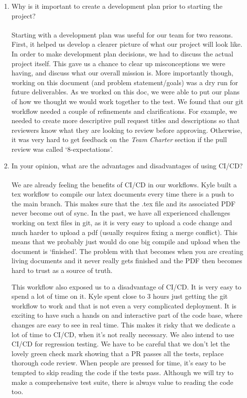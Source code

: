 \documentclass{article}
\begin{document}
\begin{itemize}
\begin{enumerate}
    \item Why is it important to create a development plan prior to starting the
    project?\\\\
    Starting with a development plan was useful for our team for two reasons. First, it helped us develop a clearer picture of what our project will look
    like. In order to make development plan decisions, we had to discuss the actual project itself. This gave us a chance to clear up misconceptions
    we were having, and discuss what our overall mission is. More importantly though, working on this document (and problem statement/goals)
    was a dry run for future deliverables. As we worked on this doc, we were able to put our plans of how we thought we would work together to the test. We found 
    that our git workflow needed a couple of refinements and clarifications. For example, we needed to create more descriptive pull request titles and descriptions
    so that reviewers know what they are looking to review before approving. Otherwise, it was very hard to get feedback on the \textit{Team Charter} section if the 
    pull review was called `8-expectations'.
  
    \item In your opinion, what are the advantages and disadvantages of using
    CI/CD?\\\\
    We are already feeling the benefits of CI/CD in our workflows. Kyle built a tex workflow to compile our latex documents every time there is a push to the
    main branch. This makes sure that the .tex file and its associated PDF never become out of sync. In the past, we have all experienced challenges working on
    text files in git, as it is very easy to upload a code change and much harder to upload a pdf (usually requires fixing a merge conflict). This means that
    we probably just would do one big compile and upload when the document is `finished'. The problem with that becomes when you are creating living documents
    and it never really gets finished and the PDF then becomes hard to trust as a source of truth.

    This workflow also exposed us to a disadvantage of CI/CD. It is very easy to spend a lot of time on it. Kyle spent close to 3 hours just getting the git workflow to work
    and that is not even a very complicated deployment. It is exciting to have such a hands on and interactive part of the code base, where changes are easy
    to see in real time. This makes it risky that we dedicate a lot of time to CI/CD, when it's not really necessary. We also intend to use CI/CD for regression testing.
    We have to be careful that we don't let the lovely green check mark showing that a PR passes all the tests, replace thorough code review. When people are pressed for time, it's
    easy to be tempted to skip reading the code if the tests pass. Although we will try to make a comprehensive test suite, there is always value to reading the code too.


\end{enumerate}
\end{itemize}
\end{document}
